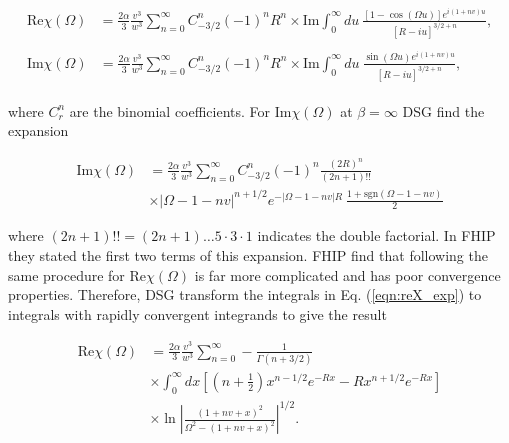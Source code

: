 \begin{subequations}
    \begin{align}
    \begin{split}
        \text{Re} \chi(\Omega) &= \frac{2\alpha}{3} \frac{v^3}{w^3} \sum_{n = 0}^\infty C^n_{-3/2} (-1)^n R^n \times \text{Im} \int^{\infty}_0 du\ \frac{\left[1 - \cos(\Omega u)\right] e^{i(1+nv)u}}{\left[R - iu\right]^{3/2 + n}},
    \end{split}\\
    \begin{split}\label{eqn:reX_exp}
        \text{Im} \chi(\Omega) &= \frac{2\alpha}{3} \frac{v^3}{w^3} \sum_{n = 0}^\infty C^n_{-3/2} (-1)^n R^n \times \text{Im} \int^{\infty}_0 du\ \frac{\sin(\Omega u) e^{i(1+nv)u}}{\left[R - iu\right]^{3/2 + n}},
    \end{split}
    \end{align}
\end{subequations}

where $C^n_r$ are the binomial coefficients. For $\text{Im}\chi(\Omega)$ at $\beta = \infty$ DSG find the expansion

\begin{equation}
    \begin{split}
        \textrm{Im}\chi(\Omega) &= \frac{2\alpha}{3} \frac{v^3}{w^3} \sum_{n=0}^\infty C^n_{-3/2} (-1)^n \frac{(2R)^n}{(2n + 1)!!} \\
        &\times |\Omega -1 - nv|^{n + 1/2} e^{-|\Omega - 1 -nv|R}\ \frac{1 + \textrm{sgn}(\Omega - 1 - nv)}{2}
    \end{split}
\end{equation}

where $(2n + 1)!! = (2n + 1) \dots 5 \cdot 3 \cdot 1$ indicates the double factorial. In FHIP they stated the first two terms of this expansion. FHIP find that following the same procedure for $\text{Re}\chi(\Omega)$ is far more complicated and has poor convergence properties. Therefore, DSG transform the integrals in Eq. (\ref{eqn:reX_exp}) to integrals with rapidly convergent integrands to give the result

\begin{equation}
    \begin{split}
    \textrm{Re}\chi(\Omega) &= \frac{2\alpha}{3} \frac{v^3}{w^3} \sum_{n=0}^\infty -\frac{1}{\Gamma(n + 3/2)} \\
    &\times\int_0^\infty dx \left[ \left(n + \frac{1}{2}\right) x^{n-1/2} e^{-Rx} - R x^{n + 1/2} e^{-Rx} \right] \\
    &\times \ln{\left| \frac{(1 + nv + x)^2}{\Omega^2 - (1 + nv + x)^2} \right|^{1/2}}.
    \end{split}
\end{equation}

